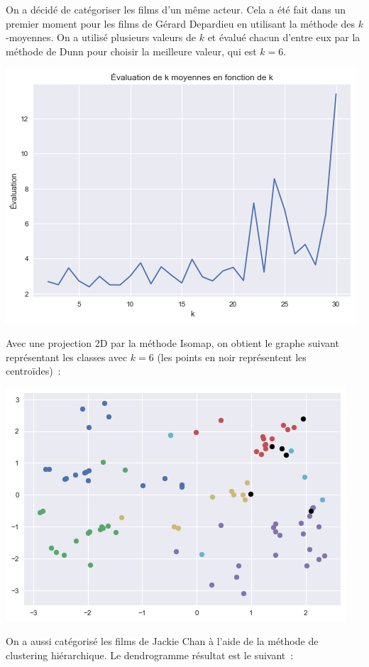 \documentclass[10pt]{article}
\theoremstyle{plain}
\theoremstyle{definition}
\numberwithin{table}{section}
\numberwithin{figure}{section}
\numberwithin{equation}{section}
\begin{document}
\begin{center}
{\begin{minipage}{21cm}
\begin{multicols}{3}
On a décidé de catégoriser les films d’un même acteur. Cela a été fait dans un premier moment pour les films de Gérard Depardieu en utilisant la méthode des $k$-moyennes. On a utilisé plusieurs valeurs de $k$ et évalué chacun d'entre eux par la méthode de Dunn pour choisir la meilleure valeur, qui est $k = 6$.

\includegraphics[width=\columnwidth]{kmoyennes2}

Avec une projection 2D par la méthode Isomap, on obtient le graphe suivant représentant les classes avec $k = 6$ (les points en noir représentent les centroïdes)~:

\includegraphics[width=\columnwidth]{kmoyennes2D}

On a aussi catégorisé les films de Jackie Chan à l'aide de la méthode de clustering hiérarchique. Le dendrogramme résultat est le suivant~:


\end{multicols}
\end{minipage}}
\end{center}
\end{document}
